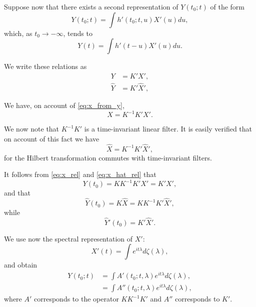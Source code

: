 \documentclass{article}
\begin{document}
Suppose now that there exists a second representation of $Y(t_0; t)$ of the form
\begin{equation}
\label{eq:y_t0_alt}
Y(t_0; t) = \int h'(t_0; t, u)X'(u)du,
\end{equation}
which, as $t_0 \to -\infty$, tends to
\begin{equation}
\label{eq:y_stationary_alt}
Y(t) = \int h'(t-u)X'(u)du.
\end{equation}

We write these relations as
\begin{align}
Y &= K'X', \label{eq:y_short_alt} \\
\hat{Y} &= K'\hat{X}', \label{eq:y_hat_short_alt}
\end{align}

We have, on account of \eqref{eq:x_from_y},
\begin{equation}
\label{eq:x_rel}
X = K^{-1}K'X'.
\end{equation}

We now note that $K^{-1}K'$ is a time-invariant linear filter. It is easily verified
that on account of this fact we have
\begin{equation}
\label{eq:x_hat_rel}
\hat{X} = K^{-1}K'\hat{X}',
\end{equation}
for the Hilbert transformation commutes with time-invariant filters.

It follows from \eqref{eq:x_rel} and \eqref{eq:x_hat_rel} that
\begin{equation}
\label{eq:y_t0_rel}
Y(t_0) = KK^{-1}K'X' = K'X',
\end{equation}
and that
\begin{equation}
\label{eq:y_hat_t0_rel}
\hat{Y}(t_0) = K\hat{X} = KK^{-1}K'\hat{X}',
\end{equation}
while
\begin{equation}
\label{eq:y_hat_prime_t0}
\hat{Y}'(t_0) = K'\hat{X}'.
\end{equation}

We use now the spectral representation of $X'$:
\begin{equation}
\label{eq:x_prime_spectral}
X'(t) = \int e^{it\lambda}d\zeta(\lambda),
\end{equation}
and obtain
\begin{align}
Y(t_0; t) &= \int A'(t_0; t, \lambda)e^{it\lambda}d\zeta(\lambda), \label{eq:y_t0_spectral1} \\
&= \int A''(t_0; t, \lambda)e^{it\lambda}d\zeta(\lambda), \label{eq:y_t0_spectral2}
\end{align}
where $A'$ corresponds to the operator $KK^{-1}K'$ and $A''$ corresponds to $K'$.
\end{document}

